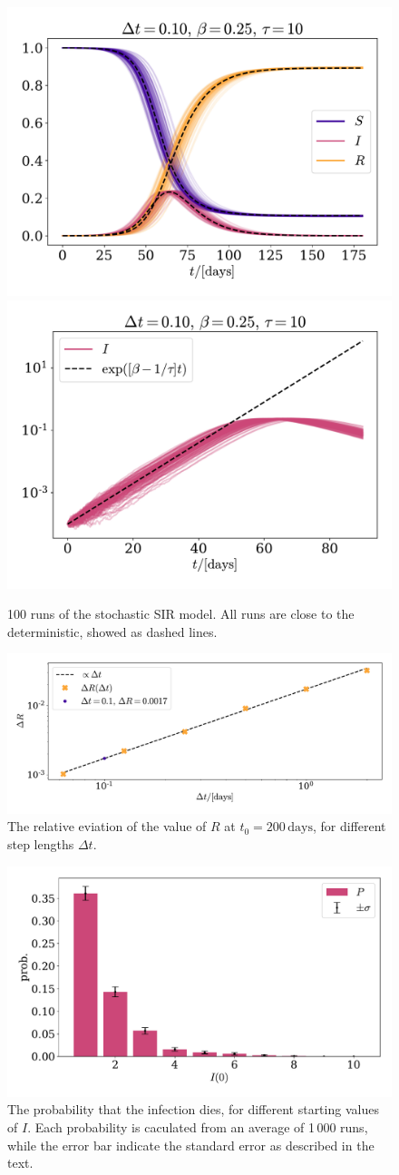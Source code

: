 \documentclass{article}
\begin{document}
    \begin{figure}[H]
        \centering
        \includegraphics[width=.49\textwidth]{../plots/2B/TestSIR_stoch.pdf}
        \includegraphics[width=.49\textwidth]{../plots/2B/TestI_stoch.pdf}
        \caption{100 runs of the stochastic SIR model. All runs are close to the deterministic, showed as dashed lines.}
        \label{stochastic SIR}
    \end{figure}

    \begin{figure}[H]
        \centering
        \includegraphics[width=.7\textwidth]{../plots/2B/conv.pdf}
        \caption{The relative eviation of the value of $R$ at $t_0=200 \, \mathrm{ days }$, for different step lengths $\Delta t$.}
        \label{conv}
    \end{figure}


    \begin{figure}[H]
        \centering
        \includegraphics[width=.7\textwidth]{../plots/2B/disappear.pdf}
        \caption{The probability that the infection dies, for different starting values of $I$. Each probability is caculated from an average of 1\,000 runs, while the error bar indicate the standard error as described in the text.}
        \label{Disappear}
    \end{figure}
\end{document}
